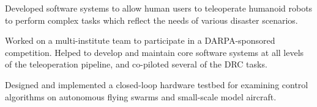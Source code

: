 \documentclass[10pt,a4paper,ragged2e]{altacv}
\begin{document}
\divider

Developed software systems to allow human users to teleoperate humanoid robots to perform complex tasks which reflect the needs of various disaster scenarios.

\divider

Worked on a multi-institute team to participate in a DARPA-sponsored competition. Helped to develop and maintain core software systems at all levels of the teleoperation pipeline, and co-piloted several of the DRC tasks.

\divider

Designed and implemented a closed-loop hardware testbed for examining control algorithms on autonomous flying swarms and small-scale model aircraft.

\clearpage


\nocite{*}


\printbibliography[heading=pubtype,title={\printinfo{\faGraduationCap}{Doctoral Thesis}},type=thesis]

\divider

\printbibliography[heading=pubtype,title={\printinfo{\faFileTextO}{Journal Article}},type=article]

\divider

\printbibliography[heading=pubtype,title={\printinfo{\faGroup}{Conference Proceedings}},type=inproceedings]


\end{document}

